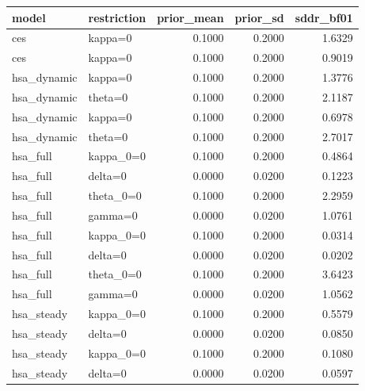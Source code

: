 \begin{tabular}{llrrr}
\toprule
model & restriction & prior\_mean & prior\_sd & sddr\_bf01 \\
\midrule
ces & kappa=0 & 0.1000 & 0.2000 & 1.6329 \\
ces & kappa=0 & 0.1000 & 0.2000 & 0.9019 \\
hsa\_dynamic & kappa=0 & 0.1000 & 0.2000 & 1.3776 \\
hsa\_dynamic & theta=0 & 0.1000 & 0.2000 & 2.1187 \\
hsa\_dynamic & kappa=0 & 0.1000 & 0.2000 & 0.6978 \\
hsa\_dynamic & theta=0 & 0.1000 & 0.2000 & 2.7017 \\
hsa\_full & kappa\_0=0 & 0.1000 & 0.2000 & 0.4864 \\
hsa\_full & delta=0 & 0.0000 & 0.0200 & 0.1223 \\
hsa\_full & theta\_0=0 & 0.1000 & 0.2000 & 2.2959 \\
hsa\_full & gamma=0 & 0.0000 & 0.0200 & 1.0761 \\
hsa\_full & kappa\_0=0 & 0.1000 & 0.2000 & 0.0314 \\
hsa\_full & delta=0 & 0.0000 & 0.0200 & 0.0202 \\
hsa\_full & theta\_0=0 & 0.1000 & 0.2000 & 3.6423 \\
hsa\_full & gamma=0 & 0.0000 & 0.0200 & 1.0562 \\
hsa\_steady & kappa\_0=0 & 0.1000 & 0.2000 & 0.5579 \\
hsa\_steady & delta=0 & 0.0000 & 0.0200 & 0.0850 \\
hsa\_steady & kappa\_0=0 & 0.1000 & 0.2000 & 0.1080 \\
hsa\_steady & delta=0 & 0.0000 & 0.0200 & 0.0597 \\
\bottomrule
\end{tabular}
